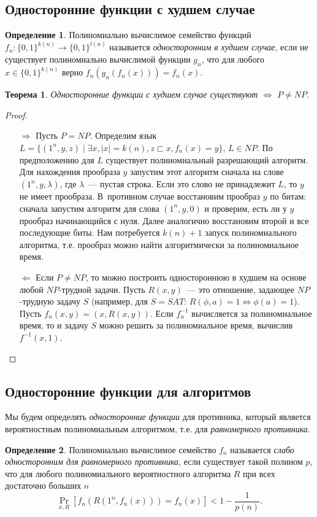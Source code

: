 \documentclass[12pt]{article}
\newcommand{\bits}{\{0,1\}}
\theoremstyle{definition}
\newtheorem{definition}{Определение}[section]
\theoremstyle{plain}
\newtheorem{theorem}{Теорема}[section]
\theoremstyle{remark}
\begin{document}
\subsection{Односторонние функции с худшем случае}
\begin{definition}
Полиномиально вычислимое семейство функций $f_n:\bits^{k(n)}\to \bits^{l(n)}$ называется 
\emph{односторонним в худшем случае}, если не существует полиномиально вычислимой функции 
$g_n$, что для любого $x\in\bits^{k(n)}$ верно $f_n(g_n(f_n(x))) = f_n(x)$.
\end{definition}

\begin{theorem}\label{th:weak-owf-p-np}
Односторонние функции с худшем случае существуют $\iff$ $P\neq NP$.
\end{theorem}
\begin{proof}\mbox{}
\begin{itemize}
\item[$\Rightarrow$] Пусть $P=NP$.
Определим язык $L = \{(1^n, y, z) \mid \exists x, |x| = k(n), z \sqsubset x, f_n(x) = y\}$, $L\in NP$. По предположению для $L$ существует полиномиальный разрешающий алгоритм. 
Для нахождения прообраза $y$ запустим этот алгоритм сначала на 
слове $(1^n, y, \lambda)$, где $\lambda$~--- пустая строка. 
Если это слово не принадлежит $L$, то $y$ не имеет прообраза.
В~противном случае восстановим прообраз $y$ по битам: сначала запустим алгоритм для слова $(1^n, y, 0)$ и проверим, есть ли у $y$ прообраз начинающийся с нуля. Далее аналогично восстановим второй и все последующие биты. Нам потребуется $k(n) + 1$ запуск полиномиального алгоритма, т.е. прообраз можно найти алгоритмически за полиномиальное время.

\item[$\Leftarrow$] Если $P\neq NP$, то можно построить одностороннюю в худшем на основе любой $NP$-трудной задачи.
Пусть $R(x,y)$~--- это отношение, задающее $NP$-трудную задачу $S$
(например, для $S = SAT$: $R(\phi, a) = 1 \iff \phi(a) = 1$). Пусть $f_n(x, y) = (x, R(x,y))$. 
Если $f_n^{-1}$ вычисляется за полиномиальное время, то и задачу $S$ можно решить за полиномиальное время,
вычислив $f^{-1}(x, 1)$.

\end{itemize}
\end{proof}


\subsection{Односторонние функции для алгоритмов}
Мы будем определять \emph{односторонние функции} для противника, который является 
вероятностным полиномиальным алгоритмом, т.е. для \emph{равномерного противника}.
\begin{definition}
    Полиномиально вычислимое семейство $f_n$ называется
    \emph{слабо односторонним для равномерного противника}, 
    если существует такой полином $p$, что 
    для любого полиномиального вероятностного алгоритма $R$ 
    при всех достаточно больших $n$
            $$\Pr_{x,R}[f_n(R(1^n, f_n(x))) = f_n(x)] < 1 - \frac{1}{p(n)}.$$

\end{definition}
\end{document}

